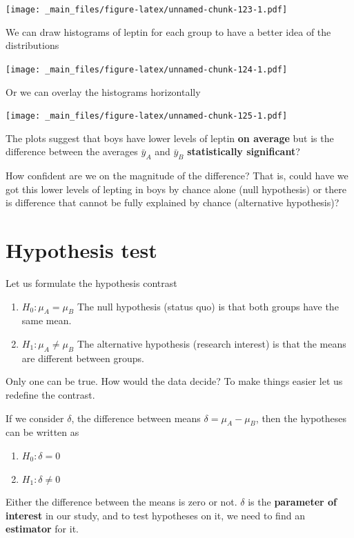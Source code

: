 \documentclass[
]{book}
\providecommand{\tightlist}{%
  \setlength{\itemsep}{0pt}\setlength{\parskip}{0pt}}
\begin{document}
\texttt{[image: \_main\_files/figure-latex/unnamed-chunk-123-1.pdf]}

We can draw histograms of leptin for each group to have a better idea of the distributions

\texttt{[image: \_main\_files/figure-latex/unnamed-chunk-124-1.pdf]}

Or we can overlay the histograms horizontally

\texttt{[image: \_main\_files/figure-latex/unnamed-chunk-125-1.pdf]}

The plots suggest that boys have lower levels of leptin \textbf{on average} but is the difference between the averages \(\bar{y}_A\) and \(\bar{y}_B\) \textbf{statistically significant}?

How confident are we on the magnitude of the difference? That is, could have we got this lower levels of lepting in boys by chance alone (null hypothesis) or there is difference that cannot be fully explained by chance (alternative hypothesis)?

\hypertarget{hypothesis-test}{%
\section{Hypothesis test}\label{hypothesis-test}}

Let us formulate the hypothesis contrast

\begin{enumerate}
\def\labelenumi{\alph{enumi}.}
\item
  \(H_0: \mu_A=\mu_B\) The null hypothesis (status quo) is that both groups have the same mean.
\item
  \(H_1: \mu_A \neq \mu_B\) The alternative hypothesis (research interest) is that the means are different between groups.
\end{enumerate}

Only one can be true. How would the data decide? To make things easier let us redefine the contrast.

If we consider \(\delta\), the difference between means \(\delta=\mu_A-\mu_B\), then the hypotheses can be written as

\begin{enumerate}
\def\labelenumi{\alph{enumi}.}
\tightlist
\item
  \(H_0: \delta=0\)
\item
  \(H_1: \delta\neq 0\)
\end{enumerate}

Either the difference between the means is zero or not. \(\delta\) is the \textbf{parameter of interest} in our study, and to test hypotheses on it, we need to find an \textbf{estimator} for it.
\end{document}
